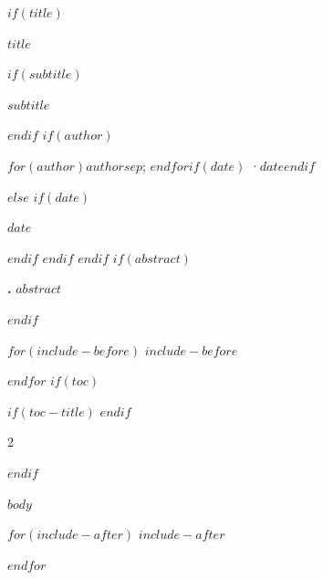 \documentclass[
  $if(fontsize)$$fontsize$$else$10pt$endif$,
  $if(papersize)$$papersize$paper$else$a4paper$endif$,
$for(classoption)$
  $classoption$,
$endfor$
]{article}
\makeatletter
\renewcommand\section{\@startsection{section}{1}{\z@}%
  {-1.5ex \@plus -.4ex \@minus -.2ex}{.5ex \@plus .1ex}%
  {\normalfont\large\bfseries\color{accent}}}
\makeatother
\begin{document}
$if(title)$
{\noindent\Large\bfseries\color{accent}$title$\par}
$if(subtitle)$
{\noindent\normalsize\itshape $subtitle$\par}
$endif$
$if(author)$
{\noindent\small\color{muted}$for(author)$$author$$sep$; $endfor$$if(date)$ \quad·\quad $date$$endif$\par}
$else$
$if(date)$
{\noindent\small\color{muted}$date$\par}
$endif$
$endif$
\vspace{3pt}
$endif$
$if(abstract)$
{\small\noindent\textbf{\abstractname.} $abstract$\par}
$endif$

$for(include-before)$
$include-before$

$endfor$
$if(toc)$
{\small
$if(toc-title)$
\renewcommand*\contentsname{$toc-title$}
$endif$
\setcounter{tocdepth}{$if(toc-depth)$$toc-depth$$else$2$endif$}
\makeatletter
\renewcommand\section{\@startsection{section}{1}{\z@}{0pt}{.3ex}{\normalfont\normalsize\bfseries\color{accent}}}
\makeatother
\begin{multicols}{2}
\tableofcontents
\end{multicols}}
$endif$

$body$

$for(include-after)$
$include-after$

$endfor$
\end{document}
